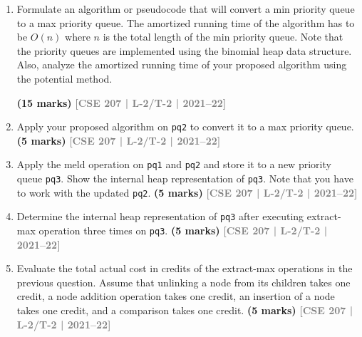 \documentclass[12pt]{article}
\newcommand{\yr}[1]{\hfill\textcolor{gray}{\small\textbf{[#1]}}}
\newcommand{\mk}[1]{\textcolor{orange!70!black}{\small\textbf{(#1 marks)}}}
\begin{document}
\begin{enumerate}
\begin{center}
  \end{center}
\begin{enumerate}
\item Formulate an algorithm or pseudocode that will convert a min priority queue to a max priority queue. The amortized running time of the algorithm has to be $O(n)$ where $n$ is the total length of the min priority queue. Note that the priority queues are implemented using the binomial heap data structure. Also, analyze the amortized running time of your proposed algorithm using the potential method.
 
\mk{15} \yr{CSE 207 | L-2/T-2 | 2021--22}

\item Apply your proposed algorithm on \texttt{pq2} to convert it to a max priority queue.
\mk{5} \yr{CSE 207 | L-2/T-2 | 2021--22}

\item Apply the meld operation on \texttt{pq1} and \texttt{pq2} and store it to a new priority queue \texttt{pq3}. Show the internal heap representation of \texttt{pq3}. Note that you have to work with the updated \texttt{pq2}.
\mk{5} \yr{CSE 207 | L-2/T-2 | 2021--22}

\item Determine the internal heap representation of \texttt{pq3} after executing extract-max operation three times on \texttt{pq3}.
\mk{5} \yr{CSE 207 | L-2/T-2 | 2021--22}

\item Evaluate the total actual cost in credits of the extract-max operations in the previous question. Assume that unlinking a node from its children takes one credit, a node addition operation takes one credit, an insertion of a node takes one credit, and a comparison takes one credit.
\mk{5} \yr{CSE 207 | L-2/T-2 | 2021--22}



\end{enumerate}
\end{enumerate}
\end{document}
